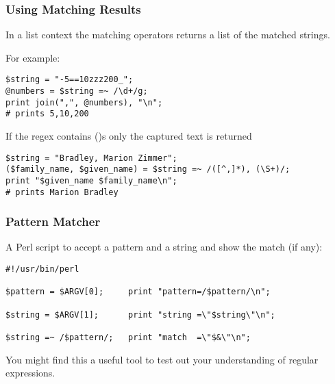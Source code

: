 \begin{frame}
\frametitle{Using Matching Results}
In a list context the matching operators
returns a list of the matched strings.

For example:

\begin{verbatim}
$string = "-5==10zzz200_";
@numbers = $string =~ /\d+/g;
print join(",", @numbers), "\n";
# prints 5,10,200
\end{verbatim}


If the regex contains ()s only the captured text is returned

\begin{verbatim}
$string = "Bradley, Marion Zimmer";
($family_name, $given_name) = $string =~ /([^,]*), (\S+)/;
print "$given_name $family_name\n";
# prints Marion Bradley
\end{verbatim}

\end{frame}

\begin{frame}
\frametitle{Pattern Matcher}
A Perl script to accept a pattern and a string and show the match (if any):
\begin{verbatim}
#!/usr/bin/perl

$pattern = $ARGV[0];     print "pattern=/$pattern/\n";

$string = $ARGV[1];      print "string =\"$string\"\n";

$string =~ /$pattern/;   print "match  =\"$&\"\n";
\end{verbatim}

{\small You might find this a useful tool to test out your understanding of regular expressions.}
\end{frame}

